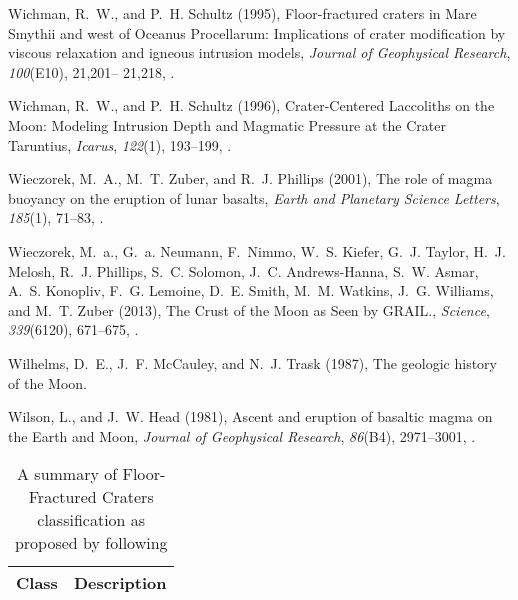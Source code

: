 \begin{article}
\begin{enumerate}
\begin{thebibliography}{39}
Wichman, R.~W., and P.~H. Schultz (1995{}), {Floor-fractured
  craters in Mare Smythii and west of Oceanus Procellarum: Implications of
  crater modification by viscous relaxation and igneous intrusion models},
  \textit{Journal of Geophysical Research}, \textit{100}(E10), 21,201-- 21,218,
  .

Wichman, R.~W., and P.~H. Schultz (1996), {Crater-Centered Laccoliths on the
  Moon: Modeling Intrusion Depth and Magmatic Pressure at the Crater
  Taruntius}, \textit{Icarus}, \textit{122}(1), 193--199,
  .

Wieczorek, M.~A., M.~T. Zuber, and R.~J. Phillips (2001), {The role of magma
  buoyancy on the eruption of lunar basalts}, \textit{Earth and Planetary
  Science Letters}, \textit{185}(1), 71--83,
  .

Wieczorek, M.~a., G.~a. Neumann, F.~Nimmo, W.~S. Kiefer, G.~J. Taylor, H.~J.
  Melosh, R.~J. Phillips, S.~C. Solomon, J.~C. Andrews-Hanna, S.~W. Asmar,
  A.~S. Konopliv, F.~G. Lemoine, D.~E. Smith, M.~M. Watkins, J.~G. Williams,
  and M.~T. Zuber (2013), {The Crust of the Moon as Seen by GRAIL.},
  \textit{Science}, \textit{339}(6120), 671--675,
  .

Wilhelms, D.~E., J.~F. McCauley, and N.~J. Trask (1987), {The geologic history
  of the Moon}.

Wilson, L., and J.~W. Head (1981), {Ascent and eruption of basaltic magma on
  the Earth and Moon}, \textit{Journal of Geophysical Research},
  \textit{86}(B4), 2971--3001, .

\end{thebibliography}

\newpage 

\begin{table}
	\caption{A summary of Floor-Fractured Craters classification as proposed by \citet{Jozwiak2012} following \citet{Schultz1976}}
	\centering
	 \begin{tabular}{c|c}
	 \hline
	 Class & Description \\
	 \hline


\end{tabular}
\end{table}
\end{enumerate}
\end{article}
